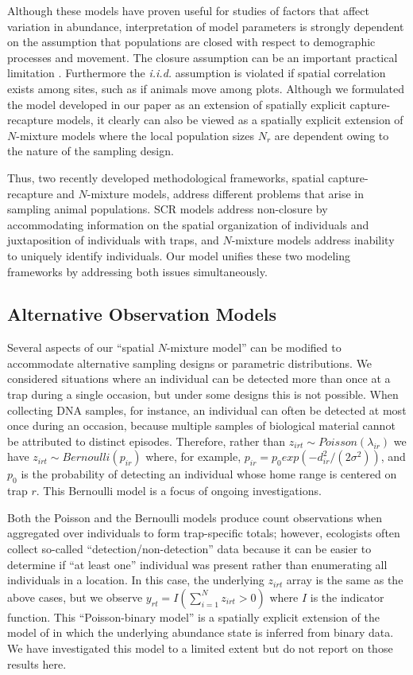 Although these models have proven useful for studies of factors that
affect variation in abundance, interpretation of model parameters is
strongly dependent on the assumption that populations are
closed with respect to demographic processes and movement. The closure
assumption can be an important practical limitation
\citep[but see][]{dailMadsen11, chandlerEA11_tempem}. Furthermore the
{\it i.i.d.} assumption is violated if spatial
correlation exists among sites, such as if animals move among plots.
Although we formulated the model developed in our paper as
an extension of spatially explicit capture-recapture models, it
clearly can
also be viewed as a spatially explicit extension of $N$-mixture models
where the local population sizes $N_{r}$ are dependent owing to the
nature of the sampling design.

Thus, two recently developed methodological frameworks, spatial
capture-recapture and $N$-mixture models, address
different problems that arise in sampling animal populations. SCR
models address non-closure by accommodating information on
the spatial organization of individuals and
juxtaposition of individuals with traps, and $N$-mixture models address
inability to uniquely identify individuals.
Our model unifies these two modeling frameworks by
addressing both issues simultaneously.


\subsection{Alternative Observation Models}
\label{ss:ext}

Several aspects of our ``spatial $N$-mixture model'' can be modified
to accommodate
alternative sampling designs or parametric distributions.
We considered situations where an individual can be detected more than
once at a trap during a single occasion, but under some designs this
is not possible. When collecting DNA samples, for instance, an
individual can often be detected at most once during an
occasion, because multiple samples of biological material cannot be
attributed
to distinct episodes. Therefore, rather than $z_{irt} \sim Poisson(\lambda_{ir})$
we have $z_{irt} \sim Bernoulli(p_{ir})$ where, for example,  $p_{ir} = p_0
exp(-d_{ir}^2/(2\sigma^2))$, and $p_0$ is the probability of
detecting an individual whose home range is centered on trap $r$. This
Bernoulli model is a focus of ongoing investigations.

Both the Poisson and the Bernoulli models
produce count observations when aggregated over individuals to form
trap-specific totals; however, ecologists often collect so-called
``detection/non-detection'' data because it can be easier to determine
if ``at least one'' individual was present rather than enumerating all
individuals in a location. In this case, the underlying $z_{irt}$
array is the same as the above cases, but we observe $y_{rt} =
I(\sum_{i=1}^{N} z_{irt} > 0)$ where $I$ is the indicator
function. This ``Poisson-binary model'' is
a spatially explicit extension of the model of
\citet{royleNichols03} in which the underlying abundance state
is inferred from binary data. We have investigated this model to a
limited extent but do not report on those results here.


